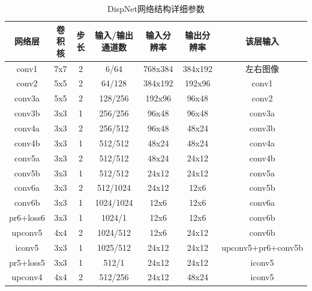\begin{table}[htbp] %
	\centering
	\caption{DispNet网络结构详细参数}
	\label{tab:4_1_DispNet_architecture}
	\begin{small}   %
		\begin{tabular*}{\textwidth}{@{\extracolsep{\fill}}c|ccc|cc|c} \toprule[2pt]
			网络层 & 卷积核 & 步长 & 输入/输出通道数 & 输入分辨率 & 输出分辨率 & 该层输入 \\ \midrule[1pt]
			conv1    & 7x7 & 2 & 6/64                & 768x384 & 384x192 & 左右图像 \\
			conv2    & 5x5 & 2 & 64/128           & 384x192  & 192x96    & conv1 \\
			conv3a & 5x5 & 2 & 128/256         & 192x96     & 96x48      & conv2 \\
			conv3b & 3x3 & 1 & 256/256        & 96x48       & 96x48      & conv3a\\
			conv4a & 3x3 & 2 & 256/512        & 96x48        & 48x24      & conv3b \\
			conv4b & 3x3 & 1 & 512/512         & 48x24        & 48x24       & conv4a \\
			conv5a & 3x3 & 2 & 512/512         & 48x24        & 24x12        & conv4b \\
			conv5b & 3x3 & 1 & 512/512         & 24x12          & 24x12       & conv5a \\
			conv6a & 3x3 & 2 & 512/1024     & 24x12          & 12x6          & conv5b \\
			conv6b & 3x3 & 1 & 1024/1024  & 12x6             & 12x6          & conv6a \\\hline
			pr6+loss6 & 3x3 & 1 & 1024/1 & 12x6 & 12x6 & conv6b \\\hline
			upconv5    & 4x4 & 2 & 1024/512  & 12x6        & 24x12    & conv6b \\
			iconv5        & 3x3 & 1 & 1025/512  & 24x12      & 24x12    & upconv5+pr6+conv5b \\
			pr5+loss5  & 3x3 & 1 & 512/1         & 24x12      & 24x12    & iconv5 \\
			upconv4    & 4x4 & 2 & 512/256   & 24x12      & 48x24    & iconv5 \\

\end{tabular*}
\end{small}
\end{table}
